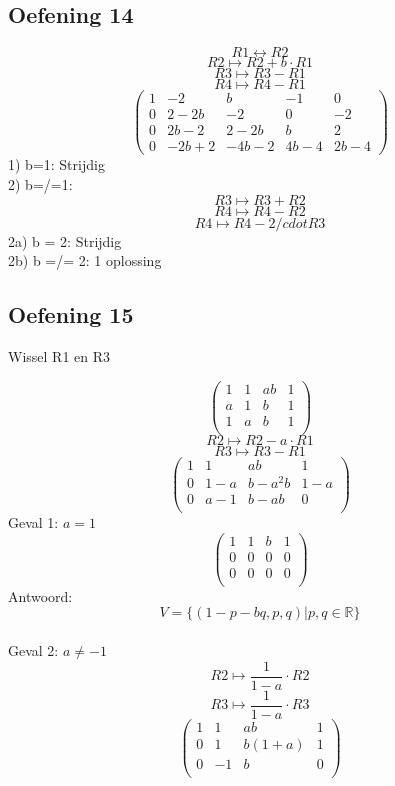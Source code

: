 \documentclass[lineaire_algebra_oplossingen.tex]{subfiles}
\begin{document}
\subsection{Oefening 14}
\[R1 \leftrightarrow R2 \]
\[R2 \longmapsto R2 + b\cdot R1\]
\[R3 \longmapsto R3 - R1\]
\[R4 \longmapsto R4 - R1\]
\[
\begin{pmatrix}
1 &  -2 &  b & -1 & 0\\
0 &  2-2b &  -2 & 0 & -2\\
0 & 2b-2 & 2-2b & b & 2\\
0 & -2b+2 & -4b-2 & 4b-4 & 2b-4
\end{pmatrix}
\]
1) b=1: Strijdig 
\[\]
2) b=/=1:
\[R3 \longmapsto R3 + R2\]
\[R4 \longmapsto R4 - R2\]
\[R4 \longmapsto R4 -2/cdot R3\]
2a) b = 2: Strijdig
\[\]
2b) b =/= 2: 1 oplossing

\subsection{Oefening 15}
\begin{center}
Wissel R1 en R3
\end{center}
\[
\begin{pmatrix}
1 & 1 & ab & 1\\
a & 1 & b & 1\\
1 & a & b & 1\\
\end{pmatrix}
\]
\[ R2 \longmapsto R2 - a\cdot R1 \]
\[ R3 \longmapsto R3 - R1 \]
\[
\begin{pmatrix}
1 & 1 & ab & 1\\
0 & 1-a & b-a^2b & 1-a\\
0 & a-1 & b-ab & 0\\
\end{pmatrix}
\]
Geval 1: $a=1$
\[
\begin{pmatrix}
1 & 1 & b & 1\\
0 & 0 & 0 & 0\\
0 & 0 & 0 & 0\\
\end{pmatrix}
\]
Antwoord:
\[
V = \{ (1-p-bq,p,q) | p,q \in \mathbb{R} \}
\]\\
Geval 2: $a \neq -1$
\[ R2 \longmapsto \frac{1}{1-a}\cdot R2 \]
\[ R3 \longmapsto \frac{1}{1-a}\cdot R3 \]
\[
\begin{pmatrix}
1 & 1 & ab & 1\\
0 & 1 & b(1+a) & 1\\
0 & -1 & b & 0\\
\end{pmatrix}
\]
\end{document}
